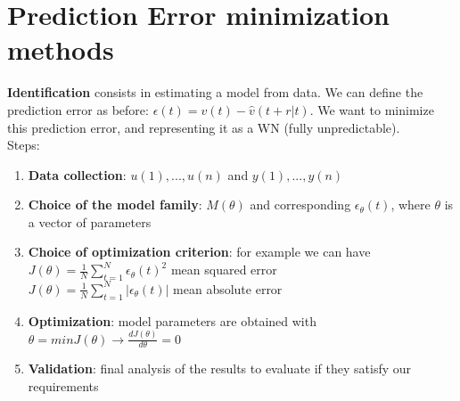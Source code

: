 \documentclass[10pt,a4paper]{article}
\begin{document}
\section{Prediction Error minimization methods}
\textbf{Identification} consists in estimating a model from data. We can define the prediction error as before: $\epsilon(t)=v(t)-\hat{v}(t+r|t)$. We want to minimize this prediction error, and representing it as a WN (fully unpredictable). \\
Steps:
\begin{enumerate}
	\item \textbf{Data collection}: ${u(1),...,u(n)}$ and ${y(1),...,y(n)}$
	\item \textbf{Choice of the model family}: $M(\theta)$ and corresponding $\epsilon_\theta(t)$, where $\theta$ is a vector of parameters
	\item \textbf{Choice of optimization criterion}: for example we can have
	\center
		$J(\theta)=\frac{1}{N}\sum_{t=1}^{N}\epsilon_\theta(t)^2$ mean squared error \\
		$J(\theta)=\frac{1}{N}\sum_{t=1}^{N}|\epsilon_\theta(t)|$ mean absolute error \\
	\raggedright
	\item \textbf{Optimization}: model parameters are obtained with $\theta=minJ(\theta) \rightarrow \frac{dJ(\theta)}{d\theta} = 0$
	\item \textbf{Validation}: final analysis of the results to evaluate if they satisfy our requirements
\end{enumerate}
\end{document}
